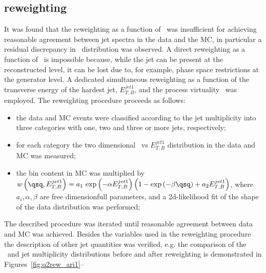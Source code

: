 \subsection{\ariadne reweighting}
It was found that the reweighting as a function of \qsq~was insufficient for achieving reasonable agreement between jet spectra in the data and the \ariadne MC, in particular a residual discrepancy in \etjetb~distribution was observed. A direct reweighting as a function of \etjetb~is impossible because, while the jet can be present at the reconstructed level, it can be lost due to, for example, phase space restrictions at the generator level. A dedicated simultaneous reweighting as a function of the transverse energy of the hardest jet, $E_{T,B}^{jet1}$, and the process virtuality \qsq~was employed. The reweighting procedure proceeds as follows:
\begin{itemize}
	\item the data and MC events were classified according to the jet multiplicity into three categories with one, two and three or more jets, respectively;
	\item for each category the two dimensional \qsq~vs $E_{T,B}^{jet1}$ distribution in the data and MC was measured;
	\item the bin content in MC was multiplied by \\$w\left( \qsq, E_{T,B}^{jet1} \right)=a_1\,\exp{\left( -\alpha E_{T,B}^{jet1}\right) }\left(1- \exp{\left( -\beta\qsq\right) } + a_2 E_{T,B}^{jet1} \right) $, where $a_i, \alpha, \beta$ are free dimensionfull parameters, and a 2d-likelihood fit of the shape of the data distribution was performed;
\end{itemize}
The described procedure was iterated until reasonable agreement between data and MC was achieved. Besides the variables used in the reweighting procedure the description of other jet quantities was verified, e.g. the comparison of the \etajetb~and jet multiplicity distributions before and after reweighting is demonstrated in Figures~\ref{fig:q2rew_ari1}--
